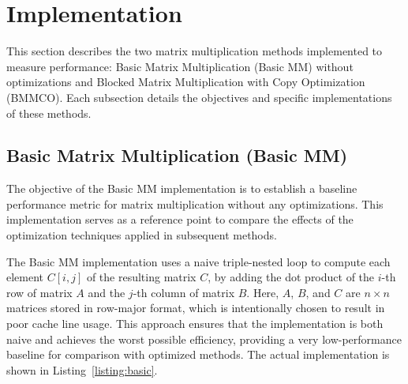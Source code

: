 
\section{Implementation}
\label{sec:implementation}
\begin{comment}
    include a separate subsection for each of the different implementations. Briefly describe your implementation, and include the use of compact pseudocode as necessary. The focus here should be on conciseness and clarity.
\end{comment}

This section describes the two matrix multiplication methods implemented to measure performance: Basic Matrix Multiplication (Basic MM) without optimizations and Blocked Matrix Multiplication with Copy Optimization (BMMCO). Each subsection details the objectives and specific implementations of these methods.

\subsection{Basic Matrix Multiplication (Basic MM)}


The objective of the Basic MM implementation is to establish a baseline performance metric for matrix multiplication without any optimizations. This implementation serves as a reference point to compare the effects of the optimization techniques applied in subsequent methods.


The Basic MM implementation uses a naive triple-nested loop to compute each element \(C[i, j]\) of the resulting matrix \(C\), by adding the dot product of the \(i\)-th row of matrix \(A\) and the \(j\)-th column of matrix \(B\). Here, \(A\), \(B\), and \(C\) are \(n \times n\) matrices stored in row-major format, which is intentionally chosen to result in poor cache line usage. This approach ensures that the implementation is both naive and achieves the worst possible efficiency, providing a very low-performance baseline for comparison with optimized methods. The actual implementation is shown in Listing~\ref{listing:basic}.

